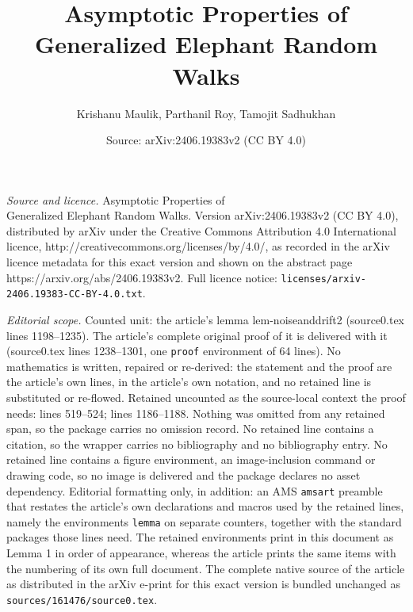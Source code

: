 \documentclass[10pt,a4paper]{amsart}
\title{Asymptotic Properties of \\ Generalized Elephant Random Walks}
\author{Krishanu Maulik, Parthanil Roy, Tamojit Sadhukhan}
\date{Source: arXiv:2406.19383v2 (CC BY 4.0)}
\begin{document}
\maketitle

\noindent\emph{Source and licence.} Asymptotic Properties of \\ Generalized Elephant Random Walks. Version arXiv:2406.19383v2 (CC BY 4.0), distributed by arXiv under the Creative Commons Attribution 4.0 International licence, http://creativecommons.org/licenses/by/4.0/, as recorded in the arXiv licence metadata for this exact version and shown on the abstract page https://arxiv.org/abs/2406.19383v2. Full licence notice: \texttt{licenses/arxiv-2406.19383-CC-BY-4.0.txt}.\par\smallskip

\noindent\textit{Editorial scope.} Counted unit: the article's lemma lem-noiseanddrift2 (source0.tex lines 1198--1235). The article's complete original proof of it is delivered with it (source0.tex lines 1238--1301, one \texttt{proof} environment of 64 lines). No mathematics is written, repaired or re-derived: the statement and the proof are the article's own lines, in the article's own notation, and no retained line is substituted or re-flowed.  Retained uncounted as the source-local context the proof needs: lines 519--524; lines 1186--1188.  Nothing was omitted from any retained span, so the package carries no omission record.  No retained line contains a citation, so the wrapper carries no bibliography and no bibliography entry.  No retained line contains a figure environment, an image-inclusion command or drawing code, so no image is delivered and the package declares no asset dependency.  Editorial formatting only, in addition: an AMS \texttt{amsart} preamble that restates the article's own declarations and macros used by the retained lines, namely the environments \texttt{lemma} on separate counters, together with the standard packages those lines need.  The retained environments print in this document as Lemma 1 in order of appearance, whereas the article prints the same items with the numbering of its own full document.  The complete native source of the article as distributed in the arXiv e-print for this exact version is bundled unchanged as \texttt{sources/161476/source0.tex}.
\end{document}
